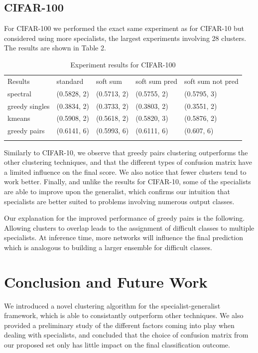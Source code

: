 \documentclass[12pt]{article}
\begin{document}
\subsection{CIFAR-100}\label{cifar-100}

For CIFAR-100 we performed the exact same experiment as for CIFAR-10 but
considered using more specialists, the largest experiments involving 28
clusters. The results are shown in Table 2.

\begin{longtable}[c]{@{}lllll@{}}
\toprule\addlinespace
Results & standard & soft sum & soft sum pred & soft sum not pred
\\\addlinespace
\midrule\endhead
spectral & (0.5828, 2) & (0.5713, 2) & (0.5755, 2) & (0.5795, 3)
\\\addlinespace
greedy singles & (0.3834, 2) & (0.3733, 2) & (0.3803, 2) & (0.3551, 2)
\\\addlinespace
kmeans & (0.5908, 2) & (0.5618, 2) & (0.5820, 3) & (0.5876, 2)
\\\addlinespace
greedy pairs & (0.6141, 6) & (0.5993, 6) & (0.6111, 6) & (0.607, 6)
\\\addlinespace
\bottomrule
\addlinespace
\caption{Experiment results for CIFAR-100}
\end{longtable}

Similarly to CIFAR-10, we observe that greedy pairs clustering
outperforms the other clustering techniques, and that the different
types of confusion matrix have a limited influence on the final score.
We also notice that fewer clusters tend to work better. Finally, and
unlike the results for CIFAR-10, some of the specialists are able to
improve upon the generalist, which confirms our intuition that
specialists are better suited to problems involving numerous output
classes.

Our explanation for the improved performance of greedy pairs is the
following. Allowing clusters to overlap leads to the assignment of
difficult classes to multiple specialists. At inference time, more
networks will influence the final prediction which is analogous to
building a larger ensemble for difficult classes.

\section{Conclusion and Future Work}\label{conclusion-and-future-work}

We introduced a novel clustering algorithm for the specialist-generalist
framework, which is able to consistantly outperform other techniques. We
also provided a preliminary study of the different factors coming into
play when dealing with specialists, and concluded that the choice of
confusion matrix from our proposed set only has little impact on the
final classification outcome.
\end{document}
